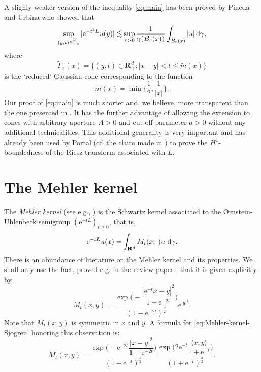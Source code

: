 \documentclass{amsart}
\theoremstyle{remark}
\newcommand{\D}{\,\textup{d}}
\newcommand{\la}{\langle}
\newcommand{\ra}{\rangle}
\renewcommand{\leq}{\leqslant}
\renewcommand{\geq}{\geqslant}
\newcommand{\R}{\mathbf R}
\newcommand{\e}{\mathrm{e}} %
\begin{document}
A slighly weaker version of the inequality \eqref{eq:main} has been proved by 
Pineda and Urbina \cite{Pineda2008} who showed that 
\begin{equation*}
  \sup_{(y, t) \in \widetilde{\Gamma}_x} |\e^{-t^2 L} u(y)|
  \lesssim \sup_{r > 0}  \frac1{\gamma(B_r(x))}\int_{B_r(x)} |u| \D\gamma,
\end{equation*}
where
\begin{equation*}
  \widetilde{\Gamma}_x(x) = \{(y, t) \in \R^d_+ : |x - y| < t \leq
  \widetilde{m}(x)\}
\end{equation*}
is the `reduced' Gaussian cone corresponding to the function
\begin{equation*}
  \widetilde{m}(x) = \min\biggl\{\frac12, \frac1{|x|}\biggr\}.
\end{equation*}
Our proof of \eqref{eq:main} is much shorter and, we believe, more transparent
than the one presented in \cite{Pineda2008}. It has the further advantage of
allowing the extension to cones with arbitrary aperture $A > 0$ and cut-off
parameter $a > 0$ without any additional technicalities. This additional
generality is very important and has already been used by Portal (cf. the claim
made in \cite[discussion preceding Lemma 2.3]{Portal2012}) to prove the
$H^1$-boundedness of the Riesz transform associated with $L$.

\section{The Mehler kernel}
The \textit{Mehler kernel} (see e.g., \cite{Sjogren1997}) is the Schwartz
kernel associated to the Ornstein-Uhlenbeck semigroup $(\e^{-tL})_{t \geq 0}$,
that is,
\begin{equation}
  \label{eq:Ornstein-Uhlenbeck-semigroup-integral}
  \e^{-tL} u(x) = \int_{\R^d} M_t(x, \cdot) u \, \D\gamma.
\end{equation}
There is an abundance of literature on the Mehler kernel and its
properties. We shall only use the fact, proved e.g. in the review paper
\cite{Sjogren1997}, that it is given explicitly by
\begin{equation}
  \label{eq:Mehler-kernel-Sjogren}
  M_t(x,y) = \frac{\exp\biggl(-\dfrac{|\e^{-t} x - y|^2}{1 - \e^{-2t}}
    \biggr)}{(1 - \e^{-2t})^{\frac{d}2}} \e^{|y|^2}.
\end{equation}
Note that $M_t(x,y)$ is symmetric in $x$ and $y$. A formula for
\eqref{eq:Mehler-kernel-Sjogren} honoring this observation is:
\begin{equation}
  \label{eq:Mehler-kernel}
  M_t(x, y) = \frac{\exp\biggl(-\e^{-2t} \dfrac{|x - y|^2}{1
      - \e^{-2 t}}  \biggr)}{(1 - \e^{-t})^{\frac{d}2}}
  \frac{\exp\biggl(2\e^{-t} \dfrac{\la x, y \ra}{1 + \e^{-t}}
    \biggr)}{(1 + \e^{-t})^{\frac{d}2}}.
\end{equation}
\end{document}
